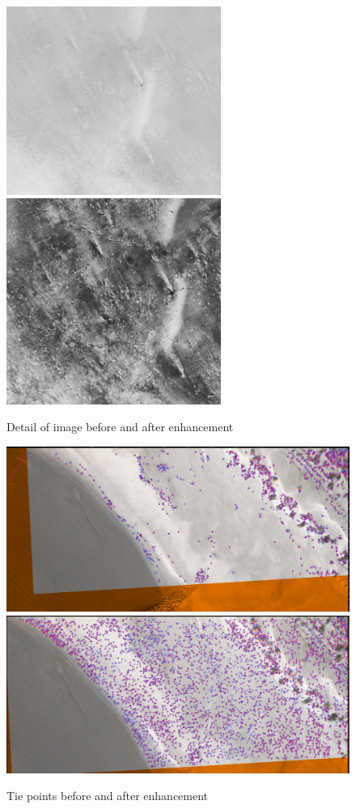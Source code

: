 \begin{figure}
\begin{center}
\includegraphics[width=70mm]{FIGS/Tapioca-SFS/Detail-STD.jpg}
\includegraphics[width=70mm]{FIGS/Tapioca-SFS/Detail-SFS.jpg}
\end{center}
\caption{Detail of image before and after enhancement}
\label{FIG:SF:Det}
\end{figure}


\begin{figure}
\begin{center}
\includegraphics[width=160mm]{FIGS/Tapioca-SFS/SIFT-STD.jpg}
\includegraphics[width=160mm]{FIGS/Tapioca-SFS/SIFT-SFS.jpg}
\end{center}
\caption{Tie points before and after enhancement}
\label{FIG:SF:TieP}
\end{figure}

